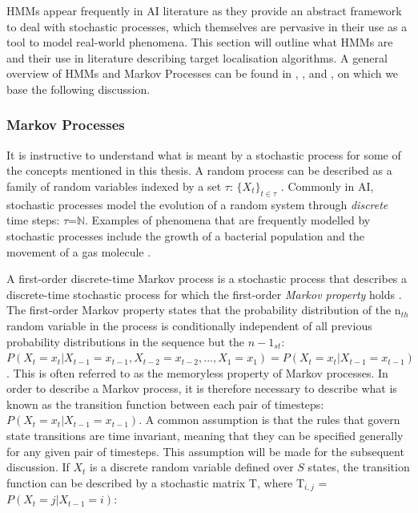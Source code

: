      
HMMs appear frequently in AI literature as they provide an abstract framework to deal with stochastic processes, which themselves are pervasive in their use as a tool to model real-world phenomena. This section will outline what HMMs are and their use in literature describing target localisation algorithms. A general overview of HMMs and Markov Processes can be found in \cite{Murphy1994DynamicLearning}, \cite{Ghahramani2001AnNetworks}, \cite{Bhattacharya2009StochasticApplications} and \cite{papoulis02}, on which we base the following discussion.

\subsubsection{Markov Processes}\label{subsubsec:MarkovProcesses}
It is instructive to understand what is meant by a stochastic process for some of the concepts mentioned in this thesis. A random process can be described as a family of random variables indexed by a set $\tau$: $\{X_t\}_{t\in\tau}$ \cite{Bhattacharya2009StochasticApplications}. Commonly in AI, stochastic processes model the evolution of a random system through \textit{discrete} time steps: $\tau$=$\mathbb N$. Examples of phenomena that are frequently modelled by stochastic processes include the growth of a bacterial population and the movement of a gas molecule \cite{Bhattacharya2009StochasticApplications}.\par

A first-order discrete-time Markov process is a stochastic process that describes a discrete-time stochastic process for which the first-order \textit{Markov property} holds \cite{Ghahramani2001AnNetworks}. The first-order Markov property states that the probability distribution of the n$_{th}$ random variable in the process is conditionally independent of all previous probability distributions in the sequence but the $n-1_{st}$: $P(X_t = x_t | X_{t-1} = x_{t-1}, X_{t-2} = x_{t-2}, ... , X_{1} = x_{1}) = P(X_t = x_t | X_{t-1} = x_{t-1})$ \cite{Ghahramani2001AnNetworks}. This is often referred to as the memoryless property of Markov processes. In order to describe a Markov process, it is therefore necessary to describe what is known as the transition function between each pair of timesteps: $P(X_t = x_t | X_{t-1} = x_{t-1})$. A common assumption is that the rules that govern state transitions are time invariant, meaning that they can be specified generally for any given pair of timesteps. This assumption will be made for the subsequent discussion. If $X_t$ is a discrete random variable defined over $S$ states, the transition function can be described by a stochastic matrix T, where T$_{i,j}$ = $P(X_t = j | X_{t-1} = i)$: 

